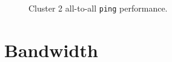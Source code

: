 \documentclass[a4paper,10pt]{article}
\begin{document}
\begin{figure}
    \centering
    \caption{Cluster 2 all-to-all \texttt{ping} performance.}
    \label{fig:ping-c2}
\end{figure}
\clearpage


\newpage
\section{Bandwidth}
\label{sec:bandwidth}
\end{document}
